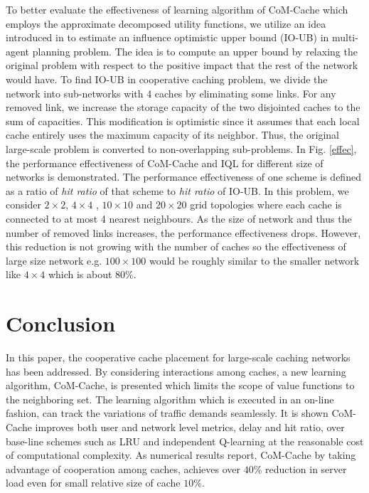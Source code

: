 \documentclass[journal,onecolumn]{IEEEtran}
\begin{document}
To better evaluate the effectiveness of learning algorithm of CoM-Cache which employs the approximate decomposed utility functions, we utilize an idea introduced in \cite{oliehoek2015influence} to estimate an influence optimistic upper bound (IO-UB) in multi-agent planning problem. The idea is to compute an upper bound by relaxing the original problem with respect to the positive
impact that the rest of the network would have.
To find IO-UB in cooperative caching problem, we divide the network into sub-networks with 4 caches by eliminating some links. For any removed link, we increase the storage capacity of the two disjointed caches to the sum of capacities. This modification is optimistic since it assumes that each local cache entirely uses the maximum capacity of its neighbor. 
Thus, the original large-scale problem is converted
to non-overlapping sub-problems. In Fig. \ref{effec}, the performance effectiveness of CoM-Cache and IQL for different size of networks is demonstrated. The performance effectiveness of one scheme is defined as a ratio of \textit{hit ratio} of that scheme to \textit{hit ratio} of IO-UB. In this problem, we consider $2\times 2$, $4\times 4$ , $10\times 10$ and $20\times 20$ grid topologies where each cache is connected to at most 4 nearest neighbours. As the size of network and thus the number of removed links increases, the performance effectiveness drops. However, this reduction is not growing with the number of caches so the effectiveness of large size network e.g. $100\times 100$ would be roughly similar to the smaller network like $4\times 4$ which is about $80\%$. 





\section{Conclusion}
\label{conc}

In this paper, the cooperative cache placement for large-scale caching networks has been addressed. By considering interactions among caches, a new learning algorithm, CoM-Cache, is presented which limits the scope of value functions to the neighboring set. The learning algorithm which is executed in an on-line fashion, can track the variations of traffic demands seamlessly. It is shown CoM-Cache improves both user and network level metrics, delay and hit ratio, over base-line schemes such as LRU and independent Q-learning at the reasonable cost of computational complexity. As numerical results report, CoM-Cache by taking advantage of cooperation among caches, achieves over $40\%$ reduction in server load even for small relative size of cache $10\%$.
\end{document}
